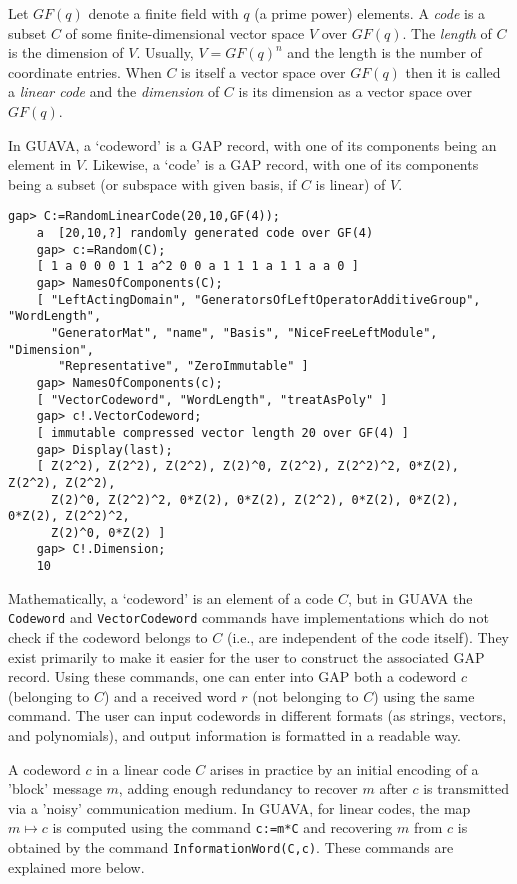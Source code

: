 \documentclass[a4paper,11pt]{report}
\begin{document}
{
  \label{Codewords} Let $GF(q)$ denote a finite field with $q$ (a prime power) elements. A \emph{code} is a subset $C$ of some finite-dimensional vector space $V$ over $GF(q)$. The \emph{length} of $C$ is the dimension of $V$. Usually, $V=GF(q)^n$ and the length is the number of coordinate entries. When $C$ is itself a vector space over $GF(q)$ then it is called a \emph{linear code}  and the \emph{dimension} of $C$ is its dimension as a vector space over $GF(q)$. 

 In \textsf{GUAVA}, a `codeword' is a GAP record, with one of its components being an element in $V$. Likewise, a `code' is a GAP record, with one of its components being a
subset (or subspace with given basis, if $C$ is linear) of $V$. 
\begin{Verbatim}[commandchars=@|E,fontsize=\small,frame=single,label=Example]
    gap> C:=RandomLinearCode(20,10,GF(4));
    a  [20,10,?] randomly generated code over GF(4)
    gap> c:=Random(C);
    [ 1 a 0 0 0 1 1 a^2 0 0 a 1 1 1 a 1 1 a a 0 ]
    gap> NamesOfComponents(C);
    [ "LeftActingDomain", "GeneratorsOfLeftOperatorAdditiveGroup", "WordLength",
      "GeneratorMat", "name", "Basis", "NiceFreeLeftModule", "Dimension", 
       "Representative", "ZeroImmutable" ]
    gap> NamesOfComponents(c);
    [ "VectorCodeword", "WordLength", "treatAsPoly" ]
    gap> c!.VectorCodeword;
    [ immutable compressed vector length 20 over GF(4) ] 
    gap> Display(last);
    [ Z(2^2), Z(2^2), Z(2^2), Z(2)^0, Z(2^2), Z(2^2)^2, 0*Z(2), Z(2^2), Z(2^2),
      Z(2)^0, Z(2^2)^2, 0*Z(2), 0*Z(2), Z(2^2), 0*Z(2), 0*Z(2), 0*Z(2), Z(2^2)^2,
      Z(2)^0, 0*Z(2) ]
    gap> C!.Dimension;
    10
\end{Verbatim}
  Mathematically, a `codeword' is an element of a code $C$, but in \textsf{GUAVA} the \texttt{Codeword} and \texttt{VectorCodeword} commands have implementations which do not check if the codeword belongs to $C$ (i.e., are independent of the code itself). They exist primarily to make it
easier for the user to construct the associated GAP record. Using these
commands, one can enter into GAP both a codeword $c$ (belonging to $C$) and a received word $r$ (not belonging to $C$) using the same command. The user can input codewords in different formats
(as strings, vectors, and polynomials), and output information is formatted in
a readable way. 

 A codeword $c$ in a linear code $C$ arises in practice by an initial encoding of a 'block' message $m$, adding enough redundancy to recover $m$ after $c$ is transmitted via a 'noisy' communication medium. In \textsf{GUAVA}, for linear codes, the map $m\longmapsto c$ is computed using the command \texttt{c:=m*C} and recovering $m$ from $c$ is obtained by the command \texttt{InformationWord(C,c)}. These commands are explained more below. 

}
\end{document}
